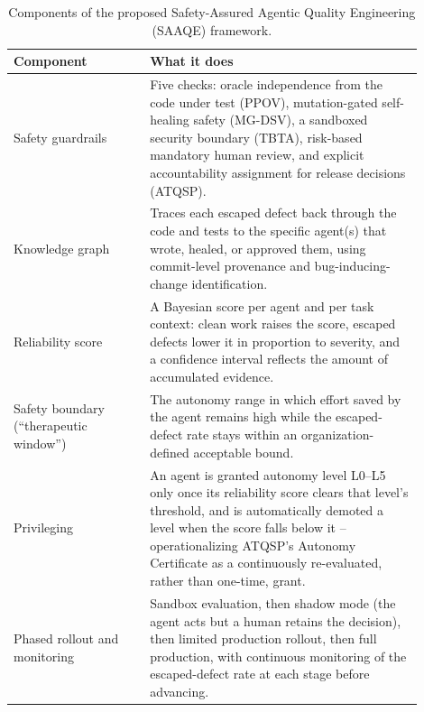 \begin{table}[t]
\caption{Components of the proposed Safety-Assured Agentic Quality
Engineering (SAAQE) framework.}
\label{tab:saaqe-components}
\begin{tabular}{p{0.3\linewidth}p{0.6\linewidth}}
\toprule
Component & What it does \\
\midrule
Safety guardrails &
Five checks: oracle independence from the code under test (PPOV),
mutation-gated self-healing safety (MG-DSV), a sandboxed security
boundary (TBTA), risk-based mandatory human review, and explicit
accountability assignment for release decisions (ATQSP). \\
Knowledge graph &
Traces each escaped defect back through the code and tests to the
specific agent(s) that wrote, healed, or approved them, using
commit-level provenance and bug-inducing-change identification. \\
Reliability score &
A Bayesian score per agent and per task context: clean work raises
the score, escaped defects lower it in proportion to severity, and a
confidence interval reflects the amount of accumulated evidence. \\
Safety boundary (``therapeutic window'') &
The autonomy range in which effort saved by the agent remains high
while the escaped-defect rate stays within an organization-defined
acceptable bound. \\
Privileging &
An agent is granted autonomy level L0--L5
\cite{feng2025autonomylevels} only once its reliability score clears
that level's threshold, and is automatically demoted a level when the
score falls below it -- operationalizing ATQSP's Autonomy Certificate
as a continuously re-evaluated, rather than one-time, grant. \\
Phased rollout and monitoring &
Sandbox evaluation, then shadow mode (the agent acts but a human
retains the decision), then limited production rollout, then full
production, with continuous monitoring of the escaped-defect rate at
each stage before advancing. \\
\bottomrule
\end{tabular}
\end{table}

